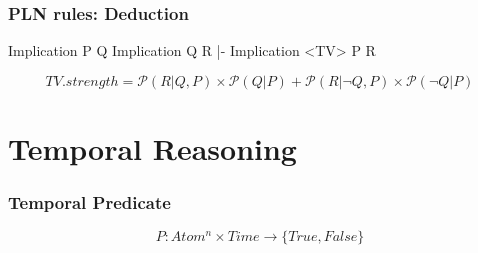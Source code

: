 \documentclass[aspectratio=169]{beamer}
\begin{document}
\begin{frame}[fragile]

  \frametitle{PLN rules: Deduction}
\begin{semiverbatim}
Implication
  P
  Q
Implication
  Q
  R
|-
Implication <TV>
  P
  R
\end{semiverbatim}
$$TV.strength = \mathcal{P}(R|Q,P)\times\mathcal{P}(Q|P) + \mathcal{P}(R|¬Q,P)\times\mathcal{P}(¬Q|P)$$
\end{frame}

\section {Temporal Reasoning}

\begin{frame}
  \frametitle{Temporal Predicate}
  $$P: Atom^n \times Time \rightarrow \{True, False\}$$

\end{frame}
\end{document}
